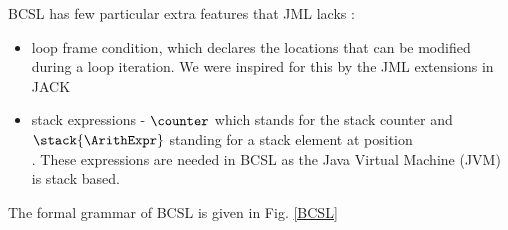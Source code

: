 BCSL has few particular extra features that JML lacks :
\begin{itemize}
   \item loop frame condition, which declares the locations
that can be modified during a loop iteration. We were inspired for this by the JML extensions in JACK ~\cite{BRL-JACK}

   \item stack expressions - $\counter$ which stands for the stack counter and \\
 $\stack{\ArithExpr}$ standing for a stack element at position \\
\ArithExpr. These expressions are needed in BCSL as the Java Virtual Machine (JVM) is
stack based.


\end{itemize}

The formal grammar of BCSL is given in Fig. \ref{BCSL}











